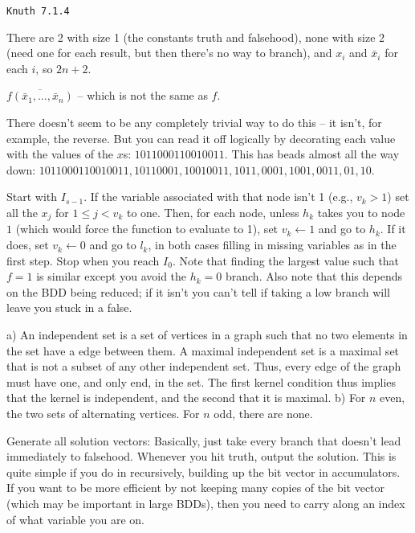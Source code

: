 \topglue 0.5in
\centerline{\tt Knuth 7.1.4}
\vskip 0.3in

 There are 2 with size 1 (the constants truth and falsehood),
none with size 2 (need one for each result, but then there's no way to branch),
and $x_i$ and $\bar x_i$ for each $i$, so $2n + 2$.

\vskip 0.08in  $\overline{f\left(\bar x_1, \ldots, \bar x_n\right)}$ --
which is not the same as $f$.

\vskip 0.08in  There doesn't seem to be any completely
trivial way to do this -- it isn't, for example, the reverse.  But you can read
it off logically by decorating each value with the values of the $x$s:
$1 0 1 1 0 0 0 1 1 0 0 1 0 0 1 1$.  This has beads almost all the way down:
$1011000110010011, 10110001, 10010011, 1011, 0001, 1001, 0011, 01, 10$. 

\vskip 0.08in  Start with $I_{s-1}$.  If the 
variable associated with that node isn't 1 (e.g., $v_k > 1$) set
all the $x_j$ for $1 \le j < v_k$ to one.  Then, for each node, unless
$h_k$ takes you to node $1$ (which would force the function to evaluate
to 1), set $v_k \gets 1$ and go to $h_k$.
If it does, set $v_k \gets 0$ and go to $l_k$, in both cases filling
in missing variables as in the first step.  Stop when you reach
$I_0$.  Note that finding the largest value such that $f=1$ is similar
except you avoid the $h_k = 0$ branch.  Also note that this depends on
the BDD being reduced; if it isn't you can't tell if taking a low branch will
leave you stuck in a false.

\vskip 0.08in  a) An independent set is a set
of vertices in a graph such that no two elements in the set have a edge
between them.  A maximal independent set is a maximal set that is
not a subset of any other independent set.  Thus, every edge of the graph must have
one, and only end, in the set. The first kernel condition thus implies that the kernel 
is independent, and the second that it is maximal.\hfil\break
b) For $n$ even, the two sets of alternating vertices.  For $n$ odd, there are none.

\vskip 0.08in  Generate all solution vectors:
Basically, just take every branch that doesn't lead immediately to falsehood.
Whenever you hit truth, output the solution.  This is quite simple if you do in 
recursively, building up the bit vector in accumulators.  If you want to be more
efficient by not keeping many copies of the bit vector (which may be important
in large BDDs), then you need to carry along an index of what variable you
are on.

